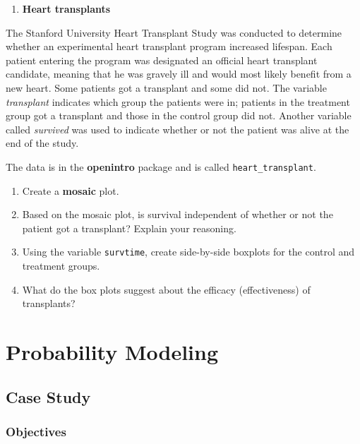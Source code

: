 \documentclass[
]{book}
\providecommand{\tightlist}{%
  \setlength{\itemsep}{0pt}\setlength{\parskip}{0pt}}
\begin{document}
\pagebreak

\begin{enumerate}
\def\labelenumi{\arabic{enumi}.}
\setcounter{enumi}{2}
\tightlist
\item
  \textbf{Heart transplants}
\end{enumerate}

The Stanford University Heart Transplant Study was conducted to determine whether an experimental heart transplant program increased lifespan. Each patient entering the program was designated an official heart transplant candidate, meaning that he was gravely ill and would most likely benefit from a new heart. Some patients got a transplant and some did not. The variable \emph{transplant} indicates which group the patients were in; patients in the treatment group got a transplant and those in the control group did not. Another variable called \emph{survived} was used to indicate whether or not the patient was alive at the end of the study.

The data is in the \textbf{openintro} package and is called \texttt{heart\_transplant}.

\begin{enumerate}
\def\labelenumi{\alph{enumi}.}
\tightlist
\item
  Create a \textbf{mosaic} plot.
\item
  Based on the mosaic plot, is survival independent of whether or not the patient got a transplant? Explain your reasoning.
\item
  Using the variable \texttt{survtime}, create side-by-side boxplots for the control and treatment groups.
\item
  What do the box plots suggest about the efficacy (effectiveness) of transplants?
\end{enumerate}

\hypertarget{part-probability-modeling}{%
\part{Probability Modeling}\label{part-probability-modeling}}

\hypertarget{CS2}{%
\chapter{Case Study}\label{CS2}}

\hypertarget{objectives-6}{%
\section{Objectives}\label{objectives-6}}
\end{document}
